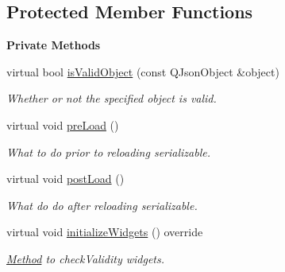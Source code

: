 \subsection*{Protected Member Functions}
\begin{Indent}\textbf{ Private Methods}\par
\begin{DoxyCompactItemize}
\item 
\mbox{\label{classrev_1_1_view_1_1_json_widget_a189246620d02e9b47074935ad803dccd}} 
virtual bool \mbox{\hyperlink{classrev_1_1_view_1_1_json_widget_a189246620d02e9b47074935ad803dccd}{is\+Valid\+Object}} (const Q\+Json\+Object \&object)
\begin{DoxyCompactList}\small\item\em Whether or not the specified object is valid. \end{DoxyCompactList}\item 
\mbox{\label{classrev_1_1_view_1_1_json_widget_aca1dab1372e9f7d4c6becbdf2a0efacc}} 
virtual void \mbox{\hyperlink{classrev_1_1_view_1_1_json_widget_aca1dab1372e9f7d4c6becbdf2a0efacc}{pre\+Load}} ()
\begin{DoxyCompactList}\small\item\em What to do prior to reloading serializable. \end{DoxyCompactList}\item 
\mbox{\label{classrev_1_1_view_1_1_json_widget_a51b99db413feebdd94d1e6e2b37c81ae}} 
virtual void \mbox{\hyperlink{classrev_1_1_view_1_1_json_widget_a51b99db413feebdd94d1e6e2b37c81ae}{post\+Load}} ()
\begin{DoxyCompactList}\small\item\em What do do after reloading serializable. \end{DoxyCompactList}\item 
\mbox{\label{classrev_1_1_view_1_1_json_widget_abf68acb8a9a798a65df738e53c4f3a49}} 
virtual void \mbox{\hyperlink{classrev_1_1_view_1_1_json_widget_abf68acb8a9a798a65df738e53c4f3a49}{initialize\+Widgets}} () override
\begin{DoxyCompactList}\small\item\em \mbox{\hyperlink{struct_method}{Method}} to check\+Validity widgets. \end{DoxyCompactList}\item 

\end{DoxyCompactItemize}
\end{Indent}
